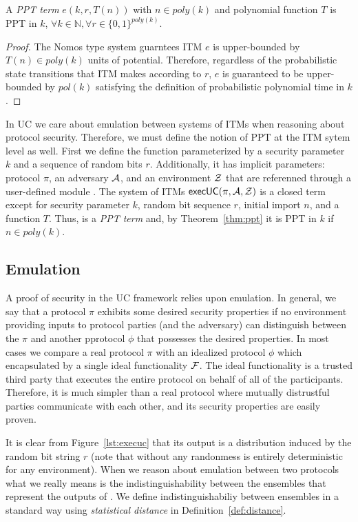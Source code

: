 \begin{theorem}[PPT in $k$]\label{thm:ppt}
A \textit{PPT term} $e(k, r, T(n))$ with $n \in poly(k)$ and polynomial function $T$ is PPT in $k$, $\forall k \in \mathbb{N}, \forall r \in \{0,1\}^{poly(k)}$.
\end{theorem}

\begin{proof}
The Nomos type system guarntees ITM $e$ is upper-bounded by $T(n) \in poly(k)$ units of potential. 
Therefore, regardless of the probabilistic state transitions that ITM makes according to $r$, $e$ is guaranteed to be upper-bounded by $pol(k)$ satisfying the definition of probabilistic polynomial time in $k$.
\end{proof}

In UC we care about emulation between systems of ITMs when reasoning about protocol security. 
Therefore, we must define the notion of PPT at the ITM sytem level as well.
First we define the  function parameterized by a security parameter $k$ and a sequence of random bits $r$.
Additionally, it has implicit parameters: protocol $\pi$, an adversary $\mathcal{A}$, and an environment $\mathcal{Z}$ that are referenned through a user-defined module .
The system of ITMs ${\mathsf {execUC}}(\pi, \mathcal{A}, \mathcal{Z})$ is a closed term except for security parameter $k$, random bit sequence $r$, initial import $n$, and a function $T$.
Thus,  is a \textit{PPT term} and, by Theorem~\ref{thm:ppt} it is PPT in $k$ if $n \in poly(k)$.


\subsection{Emulation}
A proof of security in the UC framework relies upon emulation.
In general, we say that a protocol $\pi$ exhibits some desired security properties if no environment providing inputs to protocol parties (and the adversary) can distinguish between the $\pi$ and another pprotocol $\phi$ that possesses the desired properties.
In most cases we compare a real protocol $\pi$ with an idealized protocol $\phi$ which encapsulated by a single ideal functionality $\mathcal{F}$.
The ideal functionality is a trusted third party that executes the entire protocol on behalf of all of the participants.
Therefore, it is much simpler than a real protocol where mutually distrustful parties communicate with each other, and its security properties are easily proven.

It is clear from Figure~\ref{lst:execuc} that its output is a distribution induced by the random bit string $r$ (note that without any randonmess  is entirely deterministic for any environment).
When we reason about emulation between two protocols what we really means is the indistinguishability between the ensembles that represent the outputs of .
We define indistinguishabiliy between ensembles in a standard way using \textit{statistical distance} in Definition~\ref{def:distance}.

